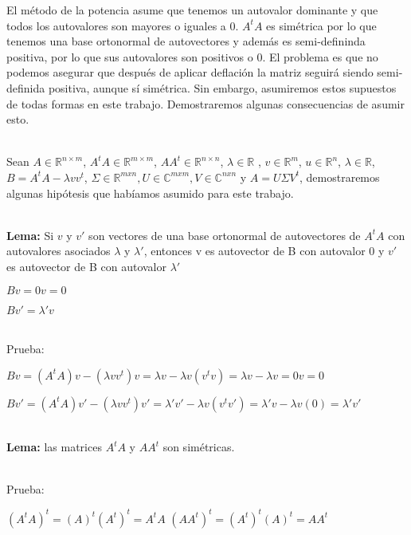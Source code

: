 El método de la potencia asume que tenemos un autovalor dominante y que todos los autovalores son
mayores o iguales a 0. $A^t A$ es simétrica por lo que tenemos una base ortonormal de autovectores
y además es semi-defininda positiva, por lo que sus autovalores son positivos o 0. El problema es
que no podemos asegurar que después de aplicar deflación la matriz seguirá siendo semi-definida
positiva, aunque sí simétrica. Sin embargo, asumiremos estos supuestos de todas formas en este
trabajo. Demostraremos algunas consecuencias de asumir esto.


\ \\

Sean $A \in \mathbb{R}^{n \times m}$, $A^t A \in \mathbb{R}^{m \times m}$, $A A^t \in \mathbb{R}^{n \times n}$, $\lambda \in \mathbb{R}$
, $v \in \mathbb{R}^m$, $u \in \mathbb{R}^n$, $\lambda \in \mathbb{R}$, $B = A^t A - \lambda v v^t$, $\Sigma \in \mathbb{R}^{mxn}, U \in \mathbb{C}^{mxm}, V \in
\mathbb{C}^{nxn}$ y $A = U \Sigma V^t$, demostraremos algunas hipótesis que habíamos asumido para
este trabajo.

\ \\
\textbf{Lema:} Si $v$ y $v'$ son vectores de una base ortonormal de autovectores de $A^t A$ con
autovalores asociados $\lambda$ y $\lambda'$, entonces v es autovector de B con autovalor 0 y $v'$
es autovector de B con autovalor $\lambda'$
\begin{compactitem}
  \item $B v = 0 v = 0$
  \item $B v' = \lambda' v$
\end{compactitem}

\ \\
Prueba:
\begin{center}
$B v =  (A^t A)v - (\lambda v v^t)v = \lambda v - \lambda v (v^t v) = \lambda v - \lambda v = 0 v =
0$

$B v' =  (A^t A)v' - (\lambda v v^t)v' = \lambda' v' - \lambda v (v^t v') = \lambda' v -
\lambda v (0) = \lambda' v'$
\end{center}


\ \\
\textbf{Lema:} las matrices $A^t A$ y $A A^t$ son simétricas.

\ \\
Prueba:

\begin{center}
  $(A^t A)^t = (A)^t (A^t)^t = A^t A$
  $(A A^t)^t = (A^t)^t (A)^t = A A^t$
\end{center}
\ \\

